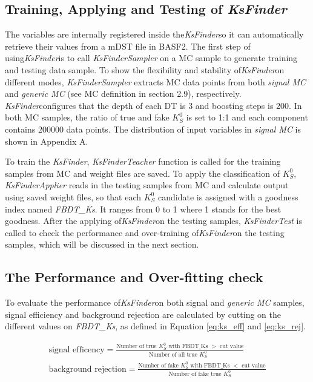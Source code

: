 \subsection{Training, Applying and Testing of \textit{KsFinder}}
The variables are internally registered inside the\textit{KsFinder}so it can automatically retrieve their values from a mDST file in BASF2. The first step of using\textit{KsFinder}is to call \textit{KsFinderSampler} on a MC sample to generate training and testing data sample. To show the flexibility and stability of\textit{KsFinder}on different modes, \textit{KsFinderSampler} extracts MC data points from both \textit{signal MC} and \textit{generic MC} (see MC definition in section 2.9), respectively. \textit{KsFinder}configures that the depth of each DT is 3 and boosting steps is 200. In both MC samples, the ratio of true and fake $K_S^0$ is set to 1:1 and each component contains 200000 data points. The distribution of input variables in \textit{signal MC} is shown in Appendix A. 

To train the \textit{KsFinder}, \textit{KsFinderTeacher} function is called for the training samples from MC and weight files are saved. To apply the classification of $K_S^0$, \textit{KsFinderApplier} reads in the testing samples from MC and calculate output using saved weight files, so that each $K_S^0$ candidate is assigned with a goodness index named \textit{FBDT\_Ks}. It ranges from 0 to 1 where 1 stands for the best goodness. After the applying of\textit{KsFinder}on the testing samples, \textit{KsFinderTest} is called to check the performance and over-training of\textit{KsFinder}on the testing samples, which will be discussed in the next section. 

\subsection{The Performance and Over-fitting check}
To evaluate the performance of\textit{KsFinder}on both signal and \textit{generic MC} samples, signal efficiency and background rejection are calculated by cutting on the different values on \textit{FBDT\_Ks}, as defined in Equation \ref{eq:ks_eff} and \ref{eq:ks_rej}.

\begin{eqnarray}
	\text{signal efficency} = \frac{\text{Number of true $K_S^0$ with FBDT\_Ks $>$ cut value}}{\text{Number of all true $K_S^0$ }} \label{eq:ks_eff}\\
	\text{background rejection} = \frac{\text{Number of fake $K_S^0$ with FBDT\_Ks $<$ cut value}}{\text{Number of fake true $K_S^0$ }} \label{eq:ks_rej}
\end{eqnarray}

